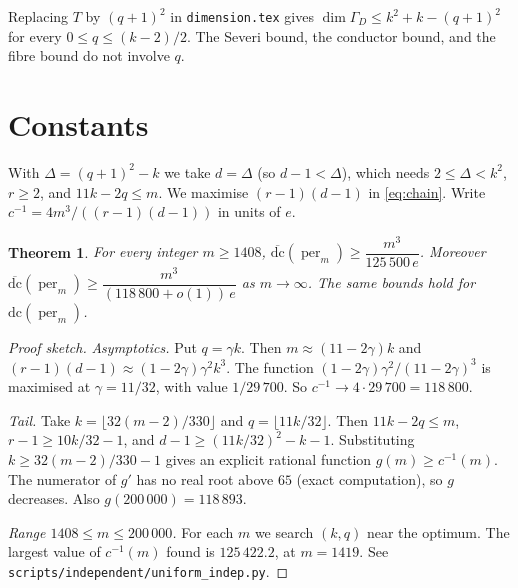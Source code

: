 \documentclass[11pt]{amsart}
\newtheorem{theorem}{Theorem}
\theoremstyle{remark}
\DeclareMathOperator{\per}{per}
\newcommand{\bdc}{\overline{\mathrm{dc}}}
\begin{document}
Replacing $T$ by $(q+1)^2$ in \texttt{dimension.tex} gives
$\dim\Gamma_D\le k^2+k-(q+1)^2$ for every $0\le q\le (k-2)/2$. The Severi bound,
the conductor bound, and the fibre bound do not involve $q$.

\section{Constants}
With $\Delta=(q+1)^2-k$ we take $d=\Delta$ (so $d-1<\Delta$), which needs
$2\le\Delta<k^2$, $r\ge2$, and $11k-2q\le m$. We maximise $(r-1)(d-1)$ in
\eqref{eq:chain}. Write $c^{-1}=4m^3/((r-1)(d-1))$ in units of $e$.

\begin{theorem}\label{thm:new}
For every integer $m\ge1408$, $\bdc(\per_m)\ge \dfrac{m^3}{125\,500\,e}$.
Moreover $\bdc(\per_m)\ge \dfrac{m^3}{(118\,800+o(1))\,e}$ as $m\to\infty$.
The same bounds hold for $\mathrm{dc}(\per_m)$.
\end{theorem}

\begin{proof}[Proof sketch]
\emph{Asymptotics.} Put $q=\gamma k$. Then $m\approx(11-2\gamma)k$ and
$(r-1)(d-1)\approx(1-2\gamma)\gamma^2k^3$. The function
$(1-2\gamma)\gamma^2/(11-2\gamma)^3$ is maximised at $\gamma=11/32$, with value
$1/29\,700$. So $c^{-1}\to4\cdot29\,700=118\,800$.

\emph{Tail.} Take $k=\lfloor 32(m-2)/330\rfloor$ and $q=\lfloor 11k/32\rfloor$.
Then $11k-2q\le m$, $r-1\ge 10k/32-1$, and $d-1\ge(11k/32)^2-k-1$. Substituting
$k\ge 32(m-2)/330-1$ gives an explicit rational function $g(m)\ge c^{-1}(m)$.
The numerator of $g'$ has no real root above $65$ (exact computation), so
$g$ decreases. Also $g(200\,000)=118\,893$.

\emph{Range $1408\le m\le200\,000$.} For each $m$ we search $(k,q)$ near the
optimum. The largest value of $c^{-1}(m)$ found is $125\,422.2$, at $m=1419$.
See \texttt{scripts/independent/uniform\_indep.py}.
\end{proof}
\end{document}
